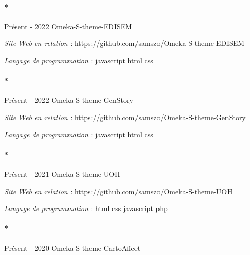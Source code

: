 \documentclass[
  a4paper,
  DIV=11,
  numbers=noendperiod]{scrreprt}
\let\oldparagraph\paragraph
\renewcommand{\paragraph}[1]{\oldparagraph{#1}\mbox{}}
\begin{document}
\paragraph*{Présent - 2022 Omeka-S-theme-EDISEM}\label{sec-item301867}

\emph{Site Web en relation} :
\url{https://github.com/samszo/Omeka-S-theme-EDISEM}

\emph{Langage de programmation} :
\href{http://localhost/samszo/omk/s/fiches/item/89711}{javascript}
\href{http://localhost/samszo/omk/s/fiches/item/96621}{html}
\href{http://localhost/samszo/omk/s/fiches/item/102418}{css}

\paragraph*{Présent - 2022 Omeka-S-theme-GenStory}\label{sec-item301870}

\emph{Site Web en relation} :
\url{https://github.com/samszo/Omeka-S-theme-GenStory}

\emph{Langage de programmation} :
\href{http://localhost/samszo/omk/s/fiches/item/89711}{javascript}
\href{http://localhost/samszo/omk/s/fiches/item/96621}{html}
\href{http://localhost/samszo/omk/s/fiches/item/102418}{css}

\paragraph*{Présent - 2021 Omeka-S-theme-UOH}\label{sec-item301832}

\emph{Site Web en relation} :
\url{https://github.com/samszo/Omeka-S-theme-UOH}

\emph{Langage de programmation} :
\href{http://localhost/samszo/omk/s/fiches/item/96621}{html}
\href{http://localhost/samszo/omk/s/fiches/item/102418}{css}
\href{http://localhost/samszo/omk/s/fiches/item/89711}{javascript}
\href{http://localhost/samszo/omk/s/fiches/item/108369}{php}

\paragraph*{Présent - 2020
Omeka-S-theme-CartoAffect}\label{sec-item301852}
\end{document}
